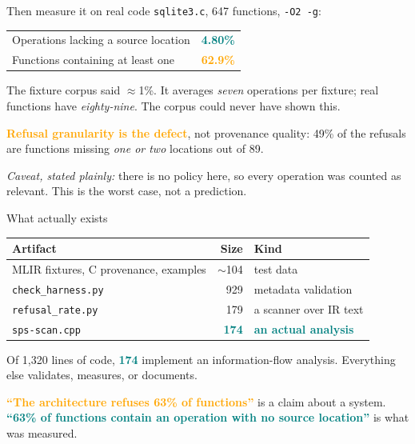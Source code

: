 \documentclass[aspectratio=169,10pt]{beamer}
\newcommand{\good}[1]{\textcolor{Teal}{\textbf{#1}}}
\newcommand{\bad}[1]{\textcolor{Orange}{\textbf{#1}}}
\newcommand{\code}[1]{\texttt{#1}}
\begin{document}
\begin{frame}{Then measure it on real code}
  \code{sqlite3.c}, 647 functions, \code{-O2 -g}:

  \begin{center}
  \begin{tabular}{@{}l r@{}}
  \toprule
  Operations lacking a source location & \good{4.80\%} \\
  Functions containing at least one    & \bad{62.9\%} \\
  \bottomrule
  \end{tabular}
  \end{center}

  \vspace{0.8em}
  The fixture corpus said $\approx$1\%. It averages \emph{seven} operations per
  fixture; real functions have \emph{eighty-nine}. The corpus could never have
  shown this.

  \vspace{0.6em}
  \bad{Refusal granularity is the defect}, not provenance quality:
  49\% of the refusals are functions missing \emph{one or two} locations out of 89.

  \vspace{0.5em}
  \emph{Caveat, stated plainly:} there is no policy here, so every operation was
  counted as relevant. This is the worst case, not a prediction.
\end{frame}

\begin{frame}{What actually exists}
  \begin{center}
  \begin{tabular}{@{}l r l@{}}
  \toprule
  Artifact & Size & Kind \\
  \midrule
  MLIR fixtures, C provenance, examples & $\sim$104 & test data \\
  \code{check\_harness.py}              & 929 & metadata validation \\
  \code{refusal\_rate.py}               & 179 & a scanner over IR text \\
  \code{sps-scan.cpp}                   & \good{174} & \good{an actual analysis} \\
  \bottomrule
  \end{tabular}
  \end{center}

  \vspace{1em}
  Of 1{,}320 lines of code, \good{174} implement an information-flow analysis.
  Everything else validates, measures, or documents.

  \vspace{0.8em}
  \bad{``The architecture refuses 63\% of functions''} is a claim about a system.\\
  \good{``63\% of functions contain an operation with no source location''} is what
  was measured.
\end{frame}
\end{document}
